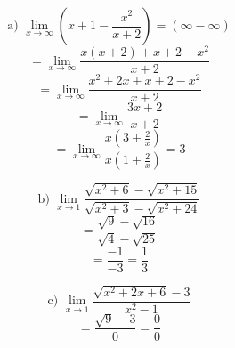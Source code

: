 \documentclass{article}
\begin{document}
\[
\text{a) } \lim_{x \to \infty} \left(x+1 - \frac{x^2}{x+2}\right) = (\infty - \infty)
\]
\[
= \lim_{x \to \infty} \frac{x(x+2) + x+2 - x^2}{x+2}
\]
\[
= \lim_{x \to \infty} \frac{x^2 + 2x + x + 2 - x^2}{x+2}
\]
\[
= \lim_{x \to \infty} \frac{3x+2}{x+2}
\]
\[
= \lim_{x \to \infty} \frac{x(3 + \frac{2}{x})}{x(1 + \frac{2}{x})} = 3
\]

\[
\text{b) } \lim_{x \to 1} \frac{\sqrt{x^2+6} - \sqrt{x^2+15}}{\sqrt{x^2+3} - \sqrt{x^2+24}}
\]
\[
= \frac{\sqrt{9} - \sqrt{16}}{\sqrt{4} - \sqrt{25}}
\]
\[
= \frac{-1}{-3} = \frac{1}{3}
\]

\[
\text{c) } \lim_{x \to 1} \frac{\sqrt{x^2+2x+6} - 3}{x^2-1}
\]
\[
= \frac{\sqrt{9} - 3}{0} = \frac{0}{0}
\]
\end{document}
